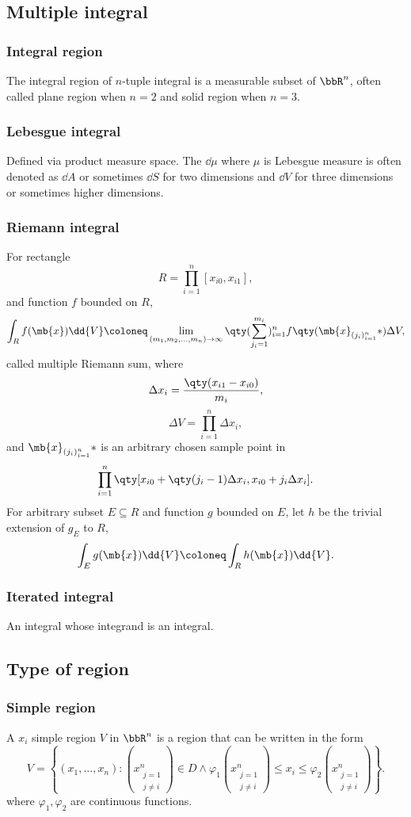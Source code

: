\documentclass[a4paper,12pt]{report}
\begin{document}
\begin{itemize}
\begin{itemize}
\subsection{Multiple integral}
\subsubsection{Integral region}
The integral region of $n$-tuple integral is a measurable subset of $\bbR^n$, often called plane region when $n=2$ and solid region when $n=3$.
\subsubsection{Lebesgue integral}
Defined via product measure space. The $\dd{\mu}$ where $\mu$ is Lebesgue measure is often denoted as $\dd{A}$ or sometimes $\dd{S}$ for two dimensions and $\dd{V}$ for three dimensions or sometimes higher dimensions.
\subsubsection{Riemann integral}
For rectangle
\[R=\prod_{i=1}^n[x_{i0},x_{i1}],\]
and function $f$ bounded on $R$,
\[\int_Rf(\mb{x})\dd{V}\coloneq\lim_{(m_1,m_2,\ldots,m_n)\to\infty}\qty(\sum_{j_i=1}^{m_i})_{i=1}^nf\qty(\mb{x}_{(j_i)_{i=1}^n}*)\Delta V,\]
called multiple Riemann sum, where
\[\Delta x_i=\frac{\qty(x_{i1}-x_{i0})}{m_i},\]
\[\Delta V=\prod_{i=1}^n\Delta x_i,\]
and $\mb{x}_{(j_i)_{i=1}^n}*$ is an arbitrary chosen sample point in
\[\prod_{i=1}^n\qty[x_{i0}+\qty(j_i-1)\Delta x_i,x_{i0}+j_i\Delta x_i].\]
For arbitrary subset $E\subseteq R$ and function $g$ bounded on $E$, let $h$ be the trivial extension of $g_E$ to $R$,
\[\int_Eg(\mb{x})\dd{V}\coloneq\int_Rh(\mb{x})\dd{V}.\]
\subsubsection{Iterated integral}
An integral whose integrand is an integral.
\subsection{Type of region}
\subsubsection{Simple region}
A $x_i$ simple region $V$ in $\bbR^n$ is a region that can be written in the form
\[V=\left\{(x_1,\ldots,x_n)\colon (x_{\substack{j=1\\j\neq i}}^n)\in D\land\varphi_1(x_{\substack{j=1\\j\neq i}}^n)\le x_i\le\varphi_2(x_{\substack{j=1\\j\neq i}}^n)\right\}.\]
where $\varphi_1,\varphi_2$ are continuous functions.

\end{itemize}
\end{itemize}
\end{document}
